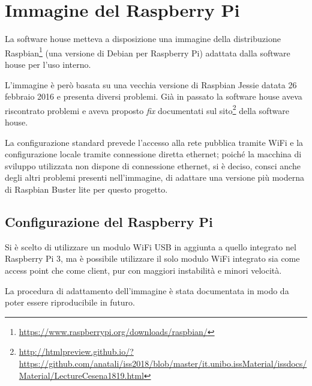 
\appendix
  \section{Immagine del Raspberry Pi}\label{app:raspi}

  La software house metteva a disposizione una immagine della distribuzione Raspbian\footnote{\url{https://www.raspberrypi.org/downloads/raspbian/}}
  (una versione di Debian per Raspberry Pi) adattata dalla software house per l'uso interno.

  L'immagine è però basata su una vecchia versione di Raspbian Jessie datata 26 febbraio 2016 e presenta diversi problemi.
  Già in passato la software house aveva riscontrato problemi e aveva proposto \textit{fix}
  documentati sul sito\footnote{\url{http://htmlpreview.github.io/?https://github.com/anatali/iss2018/blob/master/it.unibo.issMaterial/issdocs/Material/LectureCesena1819.html}}
  della software house.

  La configurazione standard prevede l'accesso alla rete pubblica tramite WiFi e la configurazione locale tramite connessione diretta ethernet;
  poiché la macchina di sviluppo utilizzata non dispone di connessione ethernet, si è deciso,
  consci anche degli altri problemi presenti nell'immagine, di adattare una versione più moderna di Raspbian Buster lite per questo progetto.

  \subsection{Configurazione del Raspberry Pi}\label{app:raspi:conf}

  Si è scelto di utilizzare un modulo WiFi USB in aggiunta a quello integrato nel Raspberry Pi 3,
  ma è possibile utilizzare il solo modulo WiFi integrato sia come access point che come client, pur con maggiori instabilità e minori velocità.

  La procedura di adattamento dell'immagine è stata documentata in modo da poter essere riproducibile in futuro.

